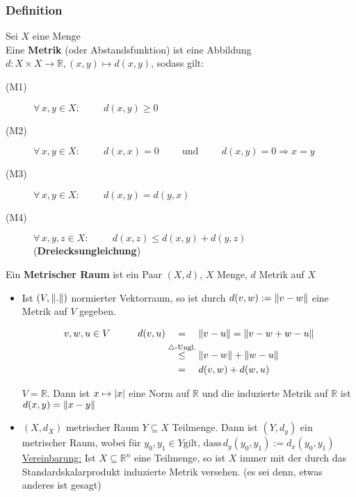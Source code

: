  \subsubsection{Definition} %
 \label{ssub:definition}
Sei $X$ eine Menge \\
Eine {\bfseries Metrik} (oder Abstandsfunktion) ist eine Abbildung $d: X \times X \to \mathbb{R} , (x,y) \mapsto d(x,y)$, sodass gilt:
\begin{description}
	\item[(M1)] $\forall\, x,y \in X: \hspace{1cm}  d(x,y) \geq  0$
	\item[(M2)] $\forall\, x,y \in X: \hspace{1cm}  d(x,x)=0   \hspace{1cm} \text{und} \hspace{1cm} 
		 		d(x,y)=0 \Rightarrow x=y$
	\item[(M3)] $\forall\, x,y \in X: \hspace{1cm} d(x,y)=d(y,x)$
	\item[(M4)] $\forall\, x,y,z \in X: \hspace{1cm}  d(x,z) \leq d(x,y)+d(y,z) \hspace{1cm}$ ({\bfseries Dreiecksungleichung}) 
\end{description}
Ein {\bfseries Metrischer Raum} ist ein Paar $(X,d)$, $X$ Menge, $d$ Metrik auf $X$
\begin{itemize}
	\item Ist $(V,\norm{.})$ normierter Vektorraum, so ist durch $d(v,w):= \norm{v-w}$ eine Metrik auf $ V$ gegeben.

\begin{align*}
	v,w,u \in V \hspace{1cm} d(v,u) &\stackrel{\hphantom{\text{$\triangle$-Ungl.}}}{=}  \norm{v-u} = \norm{v-w+w-u} \\
	&\stackrel{\text{$\triangle$-Ungl.}}{\leq} \norm{v-w} + \norm{w-u} \\ 
	&\stackrel{\hphantom{\text{$\triangle$-Ungl.}}}{=} d(v,w)+d(w,u)
\end{align*}
 
$V=\mathbb{R}$. Dann ist $x \mapsto \lvert x\rvert $ eine Norm auf $\mathbb{R}$ und die induzierte Metrik auf $\mathbb{R}$ ist $d(x,y)=\norm{x-y}$
 \item $(X,d_X)$ metrischer Raum $Y\subseteq X$ Teilmenge. Dann ist $(Y,d_y)$ ein metrischer Raum, wobei für $y_0,y_1 \in Y \text{gilt, dass} \, d_y(y_0,y_1):=d_x(y_0,y_1)$ \\
 \underline{Vereinbarung:} Ist $X \subseteq \mathbb{R}^n$ eine Teilmenge, so ist $X$ immer mit der durch das Standardskalarprodukt induzierte Metrik versehen. (es sei denn, etwas anderes ist gesagt) 
\end{itemize}

